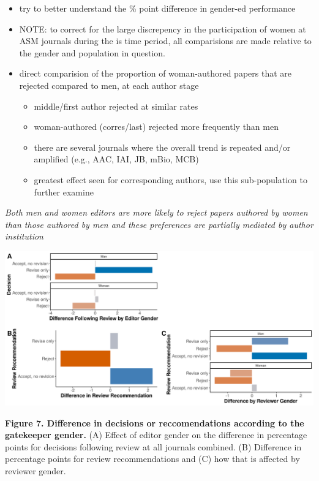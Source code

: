 \documentclass[11pt,]{article}
\providecommand{\tightlist}{%
  \setlength{\itemsep}{0pt}\setlength{\parskip}{0pt}}
\begin{document}
\begin{itemize}
\tightlist
\item
  try to better understand the \% point difference in gender-ed
  performance
\item
  NOTE: to correct for the large discrepency in the participation of
  women at ASM journals during the is time period, all comparisions are
  made relative to the gender and population in question.
\item
  direct comparision of the proportion of woman-authored papers that are
  rejected compared to men, at each author stage

  \begin{itemize}
  \tightlist
  \item
    middle/first author rejected at similar rates
  \item
    woman-authored (corres/last) rejected more frequently than men
  \item
    there are several journals where the overall trend is repeated
    and/or amplified (e.g., AAC, IAI, JB, mBio, MCB)
  \item
    greatest effect seen for corresponding authors, use this
    sub-population to further examine
  \end{itemize}
\end{itemize}

\emph{Both men and women editors are more likely to reject papers
authored by women than those authored by men and these preferences are
partially mediated by author institution}

\includegraphics{Figure_7.png}

\textbf{Figure 7. Difference in decisions or reccomendations according
to the gatekeeper gender.} (A) Effect of editor gender on the difference
in percentage points for decisions following review at all journals
combined. (B) Difference in percentage points for review recommendations
and (C) how that is affected by reviewer gender.
\end{document}
